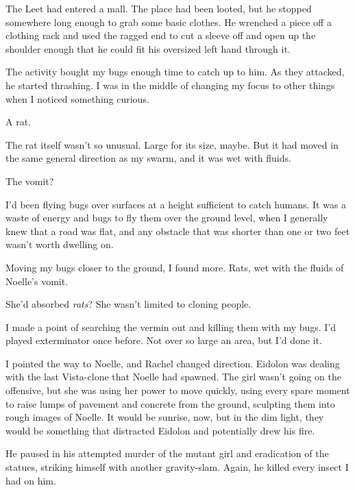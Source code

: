 The Leet had entered a mall.  The place had been looted, but he stopped somewhere long enough to grab some basic clothes.  He wrenched a piece off a clothing rack and used the ragged end to cut a sleeve off and open up the shoulder enough that he could fit his oversized left hand through it.



The activity bought my bugs enough time to catch up to him.  As they attacked, he started thrashing.  I was in the middle of changing my focus to other things when I noticed something curious.



A rat.



The rat itself wasn't so unusual.  Large for its size, maybe.  But it had moved in the same general direction as my swarm, and it was wet with fluids.



The vomit?



I'd been flying bugs over surfaces at a height sufficient to catch humans.  It was a waste of energy and bugs to fly them over the ground level, when I generally knew that a road was flat, and any obstacle that was shorter than one or two feet wasn't worth dwelling on.



Moving my bugs closer to the ground, I found more.  Rats, wet with the fluids of Noelle's vomit.



She'd absorbed \emph{rats}?  She wasn't limited to cloning people.



I made a point of searching the vermin out and killing them with my bugs.  I'd played exterminator once before.  Not over so large an area, but I'd done it.



I pointed the way to Noelle, and Rachel changed direction.  Eidolon was dealing with the last Vista-clone that Noelle had spawned.  The girl wasn't going on the offensive, but she was using her power to move quickly, using every spare moment to raise lumps of pavement and concrete from the ground, sculpting them into rough images of Noelle.  It would be sunrise, now, but in the dim light, they would be something that distracted Eidolon and potentially drew his fire.



He paused in his attempted murder of the mutant girl and eradication of the statues, striking himself with another gravity-slam.  Again, he killed every insect I had on him.



